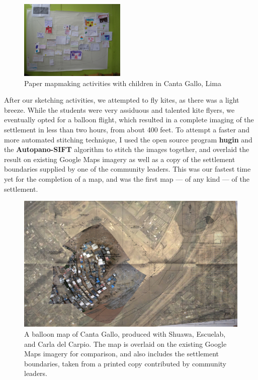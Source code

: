 \documentclass[11pt,oneside,notitlepage]{report}
\begin{document}
{{\begin{figure}
	\begin{flushright}
		\includegraphics[width=0.45\textwidth]{images/canta-gallo-drawn-map.jpg}
		\caption{Paper mapmaking activities with children in Canta Gallo, Lima}
	\end{flushright}
\end{figure}

After our sketching activities, we attempted to fly kites, as there was a light breeze. While the students were very assiduous and talented kite flyers, we eventually opted for a balloon flight, which resulted in a complete imaging of the settlement in less than two hours, from about 400 feet. To attempt a faster and more automated stitching technique, I used the open source program \textbf{hugin} and the \textbf{Autopano-SIFT} algorithm to stitch the images together, and overlaid the result on existing Google Maps imagery as well as a copy of the settlement boundaries supplied by one of the community leaders. This was our fastest time yet for the completion of a map, and was the first map --- of any kind --- of the settlement. 

\begin{figure}[h]
  \begin{center}
	\includegraphics[width=1\textwidth]{images/cantagallo-initial.jpg}
	\caption{A balloon map of Canta Gallo, produced with Shuawa, Escuelab, and Carla del Carpio. The map is overlaid on the existing Google Maps imagery for comparison, and also includes the settlement boundaries, taken from a printed copy contributed by community leaders.}
  \end{center}
\end{figure}

}}
\end{document}

